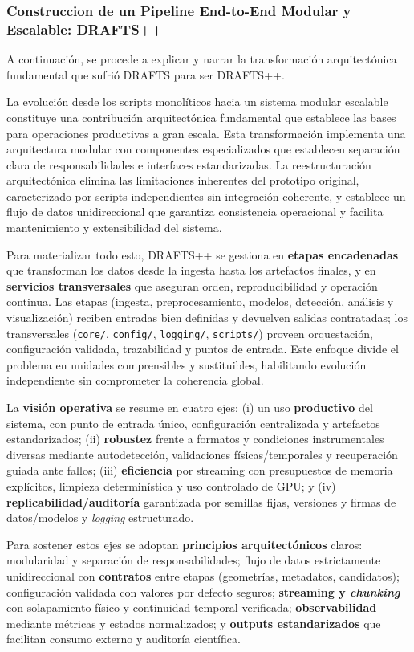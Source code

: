 \subsubsection{Construccion de un Pipeline End-to-End Modular y Escalable: DRAFTS++}

A continuación, se procede a explicar y narrar la transformación arquitectónica fundamental que sufrió DRAFTS para ser DRAFTS++. 

La evolución desde los scripts monolíticos hacia un sistema modular escalable constituye una contribución arquitectónica fundamental que establece las bases para operaciones productivas a gran escala. Esta transformación implementa una arquitectura modular con componentes especializados que establecen separación clara de responsabilidades e interfaces estandarizadas. La reestructuración arquitectónica elimina las limitaciones inherentes del prototipo original, caracterizado por scripts independientes sin integración coherente, y establece un flujo de datos unidireccional que garantiza consistencia operacional y facilita mantenimiento y extensibilidad del sistema.

Para materializar todo esto, DRAFTS++ se gestiona en \textbf{etapas encadenadas} que transforman los datos desde la ingesta hasta los artefactos finales, y en \textbf{servicios transversales} que aseguran orden, reproducibilidad y operación continua. Las etapas (ingesta, preprocesamiento, modelos, detección, análisis y visualización) reciben entradas bien definidas y devuelven salidas contratadas; los transversales (\texttt{core/}, \texttt{config/}, \texttt{logging/}, \texttt{scripts/}) proveen orquestación, configuración validada, trazabilidad y puntos de entrada. Este enfoque divide el problema en unidades comprensibles y sustituibles, habilitando evolución independiente sin comprometer la coherencia global.

La \textbf{visión operativa} se resume en cuatro ejes: (i) un uso \textbf{productivo} del sistema, con punto de entrada único, configuración centralizada y artefactos estandarizados; (ii) \textbf{robustez} frente a formatos y condiciones instrumentales diversas mediante autodetección, validaciones físicas/temporales y recuperación guiada ante fallos; (iii) \textbf{eficiencia} por streaming con presupuestos de memoria explícitos, limpieza determinística y uso controlado de GPU; y (iv) \textbf{replicabilidad/auditoría} garantizada por semillas fijas, versiones y firmas de datos/modelos y \emph{logging} estructurado.

Para sostener estos ejes se adoptan \textbf{principios arquitectónicos} claros: modularidad y separación de responsabilidades; flujo de datos estrictamente unidireccional con \textbf{contratos} entre etapas (geometrías, metadatos, candidatos); configuración validada con valores por defecto seguros; \textbf{streaming y \emph{chunking}} con solapamiento físico y continuidad temporal verificada; \textbf{observabilidad} mediante métricas y estados normalizados; y \textbf{outputs estandarizados} que facilitan consumo externo y auditoría científica.

